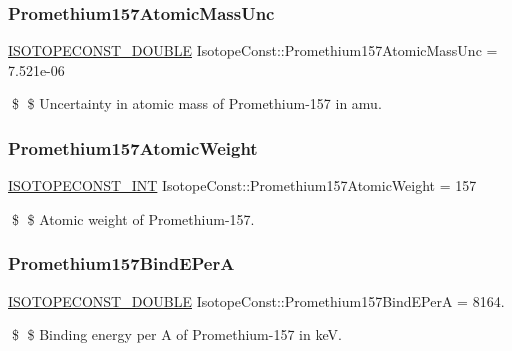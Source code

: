 \subsubsection{\texorpdfstring{Promethium157\+Atomic\+Mass\+Unc}{Promethium157AtomicMassUnc}}
{\footnotesize\ttfamily \mbox{\hyperlink{group___isotope_const-_macros_ga8f45a7272ce02c0b4c65c44636ed719a}{I\+S\+O\+T\+O\+P\+E\+C\+O\+N\+S\+T\+\_\+\+D\+O\+U\+B\+LE}} Isotope\+Const\+::\+Promethium157\+Atomic\+Mass\+Unc = 7.\+521e-\/06}

\$ \$ Uncertainty in atomic mass of Promethium-\/157 in amu. \mbox{\label{group___isotope_const-_promethium-_pm157_ga052ed29dc94e5a7ef05a863dc4a02255}} 
\subsubsection{\texorpdfstring{Promethium157\+Atomic\+Weight}{Promethium157AtomicWeight}}
{\footnotesize\ttfamily \mbox{\hyperlink{group___isotope_const-_macros_ga5f18360b3e99483a35c32d789e62621c}{I\+S\+O\+T\+O\+P\+E\+C\+O\+N\+S\+T\+\_\+\+I\+NT}} Isotope\+Const\+::\+Promethium157\+Atomic\+Weight = 157}

\$ \$ Atomic weight of Promethium-\/157. \mbox{\label{group___isotope_const-_promethium-_pm157_gac3abd1e41be989bbf688b061be82f615}} 
\subsubsection{\texorpdfstring{Promethium157\+Bind\+E\+PerA}{Promethium157BindEPerA}}
{\footnotesize\ttfamily \mbox{\hyperlink{group___isotope_const-_macros_ga8f45a7272ce02c0b4c65c44636ed719a}{I\+S\+O\+T\+O\+P\+E\+C\+O\+N\+S\+T\+\_\+\+D\+O\+U\+B\+LE}} Isotope\+Const\+::\+Promethium157\+Bind\+E\+PerA = 8164.}

\$ \$ Binding energy per A of Promethium-\/157 in keV. \mbox{\label{group___isotope_const-_promethium-_pm157_ga12aea026a2cf03440a612e938404fb6b}} 
